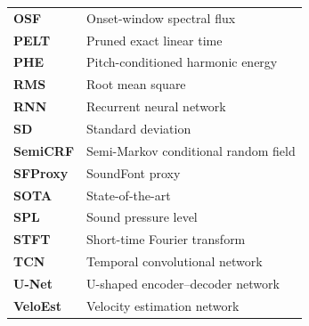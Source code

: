 \begin{longtable}{@{}p{} p{}@{}}
\textbf{OSF}       & Onset-window spectral flux \\

\textbf{PELT}      & Pruned exact linear time \\
\textbf{PHE}       & Pitch-conditioned harmonic energy \\

\textbf{RMS}       & Root mean square \\
\textbf{RNN}       & Recurrent neural network \\

\textbf{SD}        & Standard deviation \\
\textbf{SemiCRF}   & Semi-Markov conditional random field \\
\textbf{SFProxy}   & SoundFont proxy \\
\textbf{SOTA}      & State-of-the-art \\
\textbf{SPL}       & Sound pressure level \\
\textbf{STFT}      & Short-time Fourier transform \\

\textbf{TCN}       & Temporal convolutional network \\
\textbf{U-Net}     & U-shaped encoder--decoder network \\
\textbf{VeloEst}   & Velocity estimation network \\

\end{longtable}
\endgroup
